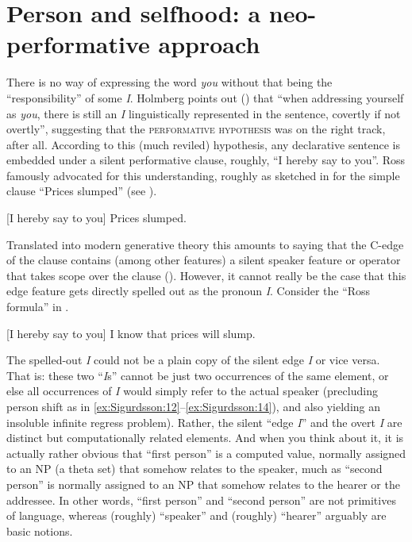 \documentclass[output=paper]{LSP/langsci}
\begin{document}
\section{Person and selfhood: a neo-performative approach}\label{sec:Sigurdsson:4}

There is no way of expressing the word \textit{you} without that being the “responsibility” of some \textit{I}. Holmberg points out (\citeyear[60–61]{Holmberg2010yourself}) that “when addressing yourself as \textit{you}, there is still an \textit{I} linguistically represented in the sentence, covertly if not overtly”, suggesting that the \textsc{performative} \textsc{hypothesis} was on the right track, after all. According to this (much reviled) hypothesis, any declarative sentence is embedded under a silent performative clause, roughly, “I hereby say to you”. Ross famously advocated for this understanding, roughly as sketched in  for the simple clause “Prices slumped” (see \citeyear[224]{Ross1970}).

\ea%
    \label{ex:Sigurdsson:26}
    	   [I hereby say to you] Prices slumped.
\z

Translated into modern generative theory this amounts to saying that the C-edge of the clause contains (among other features) a silent speaker feature or operator that takes scope over the clause (\citealt{Sigurðsson2004,Sigurðsson2014}). However, it cannot really be the case that this edge feature gets directly spelled out as the pronoun \textit{I}. Consider the “Ross formula” in .

\ea%
    \label{ex:Sigurdsson:27}
  	   [I hereby say to you] I know that prices will slump.
\z

The spelled-out \textit{I} could not be a plain copy of the silent edge \textit{I} or vice versa. That is: these two “\textit{I}s” cannot be just two occurrences of the same element, or else all occurrences of \textit{I} would simply refer to the actual speaker (precluding person shift as in \ref{ex:Sigurdsson:12}–\ref{ex:Sigurdsson:14}), and also yielding an insoluble infinite regress problem). Rather, the silent “edge \textit{I}” and the overt \textit{I} are distinct but computationally related elements. And when you think about it, it is actually rather obvious that “first person” is a computed value, normally assigned to an NP (a theta set) that somehow relates to the speaker, much as “second person” is normally assigned to an NP that somehow relates to the hearer or the addressee. In other words, “first person” and “second person” are not primitives of language, whereas (roughly) “speaker” and (roughly) “hearer” arguably are basic notions.
\end{document}
